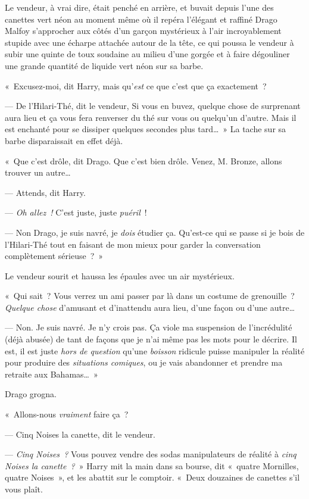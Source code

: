 Le vendeur, à vrai dire, était penché en arrière, et buvait depuis l'une des canettes vert néon au moment même où il repéra l'élégant et raffiné Drago Malfoy s'approcher aux côtés d'un garçon mystérieux à l'air incroyablement stupide avec une écharpe attachée autour de la tête, ce qui poussa le vendeur à subir une quinte de toux soudaine au milieu d'une gorgée et à faire dégouliner une grande quantité de liquide vert néon sur sa barbe.

«~Excusez-moi, dit Harry, mais qu'\emph{est} ce que c'est que ça exactement~?

--- De l'Hilari-Thé, dit le vendeur, Si vous en buvez, quelque chose de surprenant aura lieu et ça vous fera renverser du thé sur vous ou quelqu'un d'autre. Mais il est enchanté pour se dissiper quelques secondes plus tard…~» La tache sur sa barbe disparaissait en effet déjà.

«~Que c'est drôle, dit Drago. Que c'est bien drôle. Venez, M. Bronze, allons trouver un autre…

--- Attends, dit Harry.

--- \emph{Oh allez~!} C'est juste, juste \emph{puéril}~!

--- Non Drago, je suis navré, je \emph{dois} étudier ça. Qu'est-ce qui se passe si je bois de l'Hilari-Thé tout en faisant de mon mieux pour garder la conversation complètement sérieuse~?~»

Le vendeur sourit et haussa les épaules avec un air mystérieux.

«~Qui sait~? Vous verrez un ami passer par là dans un costume de grenouille~? \emph{Quelque chose} d'amusant et d'inattendu aura lieu, d'une façon ou d'une autre…

--- Non. Je suis navré. Je n'y crois pas. Ça viole ma suspension de l'incrédulité (déjà abusée) de tant de façons que je n'ai même pas les mots pour le décrire. Il est, il est juste \emph{hors de question} qu'une \emph{boisson} ridicule puisse manipuler la réalité pour produire des \emph{situations comiques}, ou je vais abandonner et prendre ma retraite aux Bahamas…~»

Drago grogna.

«~Allons-nous \emph{vraiment} faire ça~?

--- Cinq Noises la canette, dit le vendeur.

--- \emph{Cinq Noises~?} Vous pouvez vendre des sodas manipulateurs de réalité à \emph{cinq Noises la canette~?}\footnotemark{}~» Harry mit la main dans sa bourse, dit «~quatre Mornilles, quatre Noises~», et les abattit sur le comptoir. «~Deux douzaines de canettes s'il vous plaît.

